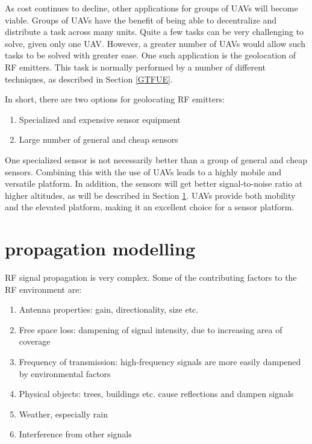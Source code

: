 \documentclass[10pt,a4paper]{book}
\begin{document}
As cost continues to decline, other applications for groups of \glspl{UAV} will become viable. Groups of \glspl{UAV} have the benefit of being able to decentralize and distribute a task across many units. Quite a few tasks can be very challenging to solve, given only one \gls{UAV}. However, a greater number of \glspl{UAV} would allow such tasks to be solved with greater ease. One such application is the geolocation of \gls{RF} emitters. This task is normally performed by a number of different techniques, as described in Section \ref{GTFUE}. 

\newpage

In short, there are two options for geolocating \gls{RF} emitters:

\begin{enumerate}
\item Specialized and expensive sensor equipment
\item Large number of general and cheap sensors
\end{enumerate}

One specialized sensor is not necessarily better than a group of general and cheap sensors. Combining this with the use of \glspl{UAV} leads to a highly mobile and versatile platform. In addition, the sensors will get better signal-to-noise ratio at higher altitudes, as will be described in Section \ref{RFPM}. \glspl{UAV} provide both mobility and the elevated platform, making it an excellent choice for a sensor platform.


\section{ propagation modelling}
\label{RFPM}
\gls{RF} signal propagation is very complex. Some of the contributing factors to the \gls{RF} environment are:
\begin{enumerate}
\item Antenna properties: gain, directionality, size etc.
\item Free space loss: dampening of signal intensity, due to increasing area of coverage
\item Frequency of transmission: high-frequency signals are more easily dampened by environmental factors
\item Physical objects: trees, buildings etc. cause reflections and dampen signals
\item Weather, especially rain
\item Interference from other signals
\end{enumerate}
\end{document}
